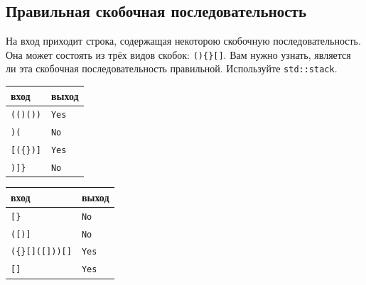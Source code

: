 \documentclass{article}
\begin{document}
\subsection{Правильная скобочная последовательность}
На вход приходит строка, содержащая некоторою скобочную последовательность. Она может состоять из трёх видов скобок: \texttt{()\{\}[]}. Вам нужно узнать, является ли эта скобочная последовательность правильной. Используйте \texttt{std::stack}.
\begin{center}
\begin{multicols}{2}
\begin{tabular}{ l | l }
 вход & выход \\ \hline
 \texttt{(()())} & \texttt{Yes}  \\ 
 \texttt{)(} &  \texttt{No}\\
 \texttt{[(\{\})]} & \texttt{Yes}  \\ 
 \texttt{)]\}} & \texttt{No}  \\ 
\end{tabular}

\begin{tabular}{ l | l }
 вход & выход \\ \hline
 \texttt{[\}} & \texttt{No}  \\ 
 \texttt{([)]} &  \texttt{No}\\
 \texttt{(\{\}[]([]))[]} & \texttt{Yes}  \\ 
 \texttt{[]} & \texttt{Yes}  \\ 
\end{tabular}
\end{multicols}
\end{center}
\end{document}

